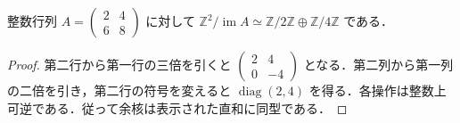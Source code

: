 \begin{example}[二生成加群の表示]
整数行列 $A=\begin{pmatrix}2&4\\6&8\end{pmatrix}$ に対して $\mathbb Z^2/\operatorname{im}A\simeq\mathbb Z/2\mathbb Z\oplus\mathbb Z/4\mathbb Z$ である．
\end{example}
\begin{proof}
第二行から第一行の三倍を引くと $\begin{pmatrix}2&4\\0&-4\end{pmatrix}$ となる．第二列から第一列の二倍を引き，第二行の符号を変えると $\operatorname{diag}(2,4)$ を得る．各操作は整数上可逆である．従って余核は表示された直和に同型である．
\end{proof}
